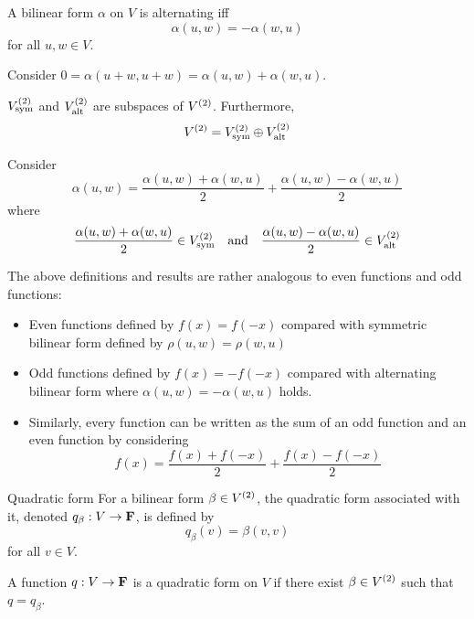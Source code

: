 \documentclass[12pt,a4paper]{article}
\begin{document}
    
    \begin{prop}
        A bilinear form $\alpha$ on $V$ is alternating iff 
        $$
        \alpha(u,w)=-\alpha(w,u)
        $$
        for all $u,w\in V$.
    \end{prop}
    \begin{remark}
        Consider $0=\alpha(u+w,u+w)=\alpha(u,w)+\alpha(w,u)$.
    \end{remark}
    \hfill

    \begin{prop}
        $V^{(2)}_{\mathrm{sym}}$ and $V^{(2)}_{\mathrm{alt}}$ are subspaces of $V^{(2)}$. Furthermore,
        $$
        V^{(2)}=V^{(2)}_{\mathrm{sym}}\oplus V^{(2)}_{\mathrm{alt}}
        $$
    \end{prop}
    \begin{remark}
        Consider
        $$
        \alpha(u,w)=\frac{\alpha(u,w)+\alpha(w,u)}{2}+\frac{\alpha(u,w)-\alpha(w,u)}{2}
        $$
        where
        $$
        \frac{\alpha(u,w)+\alpha(w,u)}{2}\in V^{(2)}_{\mathrm{sym}}\quad\text{and}\quad\frac{\alpha(u,w)-\alpha(w,u)}{2}\in V^{(2)}_{\mathrm{alt}}
        $$
    \end{remark}
    \begin{remark}
        The above definitions and results are rather analogous to even functions and odd functions:
        \begin{itemize}
            \item Even functions defined by $f(x)=f(-x)$ compared with symmetric bilinear form defined by $\rho(u,w)=\rho(w,u)$
            \item Odd functions defined by $f(x)=-f(-x)$ compared with alternating bilinear form where $\alpha(u,w)=-\alpha(w,u)$ holds.
            \item Similarly, every function can be written as the sum of an odd function and an even function by considering
            $$
            f(x)=\frac{f(x)+f(-x)}{2}+\frac{f(x)-f(-x)}{2}
            $$
        \end{itemize}
    \end{remark}
    \hfill

    \begin{defi}{Quadratic form}
        For a bilinear form $\beta\in V^{(2)}$, the quadratic form associated with it, denoted $q_\beta:V\to\mathbf{F}$, is defined by
        $$
        q_{\beta}(v)=\beta(v,v)
        $$
        for all $v\in V$.

        A function $q:V\to\mathbf{F}$ is a quadratic form on $V$ if there exist $\beta\in V^{(2)}$ such that $q=q_\beta$. 
    \end{defi}
    \hfill
\end{document}
